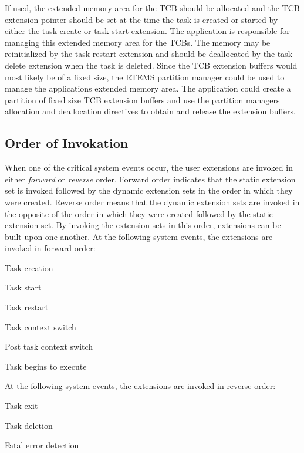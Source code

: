 If used, the extended memory area for the T\+CB should be allocated and the T\+CB extension pointer should be set at the time the task is created or started by either the task create or task start extension. The application is responsible for managing this extended memory area for the T\+C\+Bs. The memory may be reinitialized by the task restart extension and should be deallocated by the task delete extension when the task is deleted. Since the T\+CB extension buffers would most likely be of a fixed size, the R\+T\+E\+MS partition manager could be used to manage the application\textquotesingle{}s extended memory area. The application could create a partition of fixed size T\+CB extension buffers and use the partition manager\textquotesingle{}s allocation and deallocation directives to obtain and release the extension buffers.\hypertarget{group__ClassicUserExtensions_ClassicUserExtensionsOrder}{}\subsection{Order of Invokation}\label{group__ClassicUserExtensions_ClassicUserExtensionsOrder}
When one of the critical system events occur, the user extensions are invoked in either {\itshape forward} or {\itshape reverse} order. Forward order indicates that the static extension set is invoked followed by the dynamic extension sets in the order in which they were created. Reverse order means that the dynamic extension sets are invoked in the opposite of the order in which they were created followed by the static extension set. By invoking the extension sets in this order, extensions can be built upon one another. At the following system events, the extensions are invoked in forward order\+:


\begin{DoxyItemize}
\item Task creation
\item Task start
\item Task restart
\item Task context switch
\item Post task context switch
\item Task begins to execute
\end{DoxyItemize}

At the following system events, the extensions are invoked in reverse order\+:


\begin{DoxyItemize}
\item Task exit
\item Task deletion
\item Fatal error detection
\end{DoxyItemize}

